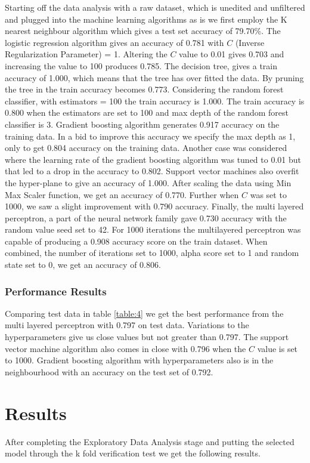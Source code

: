 \documentclass[12pt]{article}
\begin{document}
Starting off the data analysis with a raw dataset, which is unedited and unfiltered and plugged into the machine learning algorithms as is we first employ the K nearest neighbour algorithm which gives a test set accuracy of 79.70\%. The logistic regression algorithm gives an accuracy of 0.781 with $C$ (Inverse Regularization Parameter) = 1. Altering the $C$ value to 0.01 gives 0.703 and increasing the value to 100 produces 0.785. The decision tree, gives a train accuracy of 1.000, which means that the tree has over fitted the data. By pruning the tree in the train accuracy becomes 0.773. Considering the random forest classifier, with estimators = 100 the train accuracy is 1.000. The train accuracy is 0.800 when the estimators are set to 100 and max depth of the random forest classifier is 3. Gradient boosting algorithm generates 0.917 accuracy on the training data. In a bid to improve this accuracy we specify the max depth as 1, only to get 0.804 accuracy on the training data. Another case was considered where the learning rate of the gradient boosting algorithm was tuned to 0.01 but that led to a drop in the accuracy to 0.802. Support vector machines also overfit the hyper-plane to give an accuracy of 1.000. After scaling the data using Min Max Scaler function, we get an accuracy of 0.770. Further when $C$ was set to 1000, we saw a slight improvement with 0.790 accuracy. Finally, the multi layered perceptron, a part of the neural network family gave 0.730 accuracy with the random value seed set to 42. For 1000 iterations the multilayered perceptron was capable of producing a 0.908 accuracy score on the train dataset. When combined, the number of iterations set to 1000, alpha score set to 1 and random state set to 0, we get an accuracy of 0.806.

\subsubsection{Performance Results}
Comparing test data in table \ref{table:4} we get the best performance from the multi layered perceptron with 0.797 on test data. Variations to the hyperparameters give us close values but not greater than 0.797. The support vector machine algorithm also comes in close with 0.796 when the $C$ value is set to 1000. Gradient boosting algorithm with hyperparameters also is in the neighbourhood with an accuracy on the test set of 0.792.


\clearpage
\newpage
\section{Results}
After completing the Exploratory Data Analysis stage and putting the selected model through the k fold verification test we get the following results.
\end{document}
